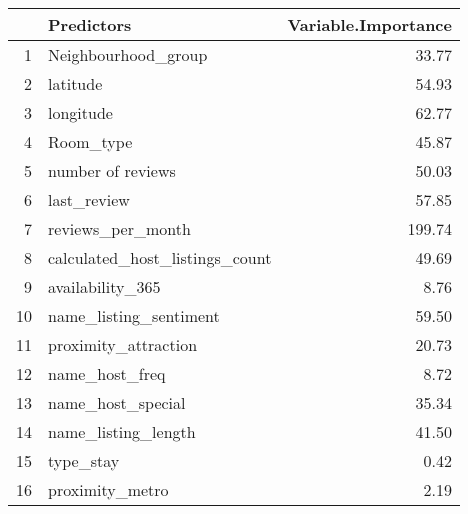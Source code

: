 \begin{table}[ht]
\centering
\begin{tabular}{rlr}
  \hline
 & Predictors & Variable.Importance \\ 
  \hline
1 & Neighbourhood\_group & 33.77 \\ 
  2 & latitude & 54.93 \\ 
  3 & longitude & 62.77 \\ 
  4 & Room\_type & 45.87 \\ 
  5 & number of reviews & 50.03 \\ 
  6 & last\_review & 57.85 \\ 
  7 & reviews\_per\_month & 199.74 \\ 
  8 & calculated\_host\_listings\_count & 49.69 \\ 
  9 & availability\_365 & 8.76 \\ 
  10 & name\_listing\_sentiment & 59.50 \\ 
  11 & proximity\_attraction & 20.73 \\ 
  12 & name\_host\_freq & 8.72 \\ 
  13 & name\_host\_special & 35.34 \\ 
  14 & name\_listing\_length & 41.50 \\ 
  15 & type\_stay & 0.42 \\ 
  16 & proximity\_metro & 2.19 \\ 
   \hline
\end{tabular}
\end{table}
